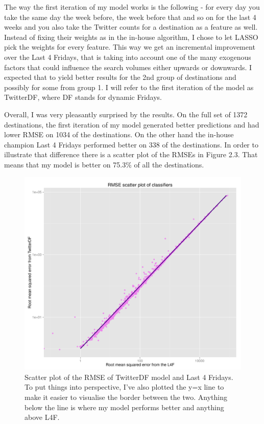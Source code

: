 \documentclass[minf,frontabs,twoside,singlespacing,parskip]{infthesis}
\begin{document}
The way the first iteration of my model works is the following - for every day you take the same day the week before, the week before that and so on for the last 4 weeks and you also take the Twitter counts for a destination as a feature as well. Instead of fixing their weights as in the in-house algorithm, I chose to let LASSO pick the weights for every feature. This way we get an incremental improvement over the Last 4 Fridays, that is taking into account one of the many exogenous factors that could influence the search volumes either upwards or downwards. I expected that to yield better results for the 2nd group of destinations and possibly for some from group 1. I will refer to the first iteration of the model as TwitterDF, where DF stands for dynamic Fridays. 


Overall, I was very pleasantly surprised by the results. On the full set of 1372 destinations, the first iteration of my model generated better predictions and had lower RMSE on 1034 of the destinations. On the other hand the in-house champion Last 4 Fridays performed better on 338 of the destinations. In order to illustrate that difference there is a scatter plot of the RMSEs in Figure 2.3. That means that my model is better on 75.3\% of all the destinations.

\begin{figure}[]
\begin{center}
\includegraphics[scale=0.4]{RMSE}
\end{center}
\caption{Scatter plot of the RMSE of TwitterDF model and Last 4 Fridays. To put things into perspective, I've also plotted the y=x line to make it easier to visualise the border between the two. Anything below the line is where my model performs better and anything above L4F.  }
\end{figure}
\end{document}
